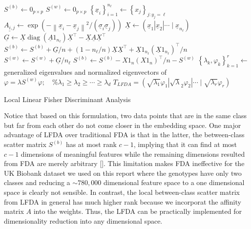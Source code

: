 \documentclass[a4paper,12pt]{article}
\begin{document}
\begin{algorithm}[H]
\SetAlgoLined
 ${S}^{(b)} \longleftarrow 0_{p \times p}$ 
 ${S}^{(w)} \longleftarrow 0_{p \times p}$ \; 
  {
 $\left\{\underline{x}_{i}\right\}_{i=1}^{n_{\ell}} \longleftarrow\left\{x_{j}\right\}_{j: y_{j}=\ell}$ \;
  {
 $\underline{A_{i, j}} \longleftarrow \exp \left(-\left\|\underline{x}_{i}-\underline{x}_{j}\right\|^{2} /\left(\underline{\sigma}_{i} \underline{\sigma}_{j}\right)\right)$}
 $\underline{X} \longleftarrow\left(\underline{x}_{1}\left|\underline{x}_{2}\right| \cdots \mid \underline{x}_{n_{\ell}}\right)$ \;
 $\underline{G} \longleftarrow \underline{X} \operatorname{diag}\left(\underline{A}{1}_{n_{\ell}}\right) \underline{X}^{\top}-\underline{X} \underline{A} \underline{X}^{\top}$ \;
 $S^{(b)} \longleftarrow {S}^{(b)}+\underline{G} / n+\left(1-n_{\ell} / n\right) \underline{X} \underline{X}^{\top}+\underline{X} 1_{n_{\ell}}\left(\underline{X} 1_{n_{\ell}}\right)^{\top} / n$ \;
 $S^{(w)} \longleftarrow {S}^{(w)}+\underline{G} / n_{\ell}$}
 $S^{(b)} \longleftarrow S^{(b)}-X 1_{n}\left(X 1_{n}\right)^{\top} / n- S^{(w)}$ \;
 $\left\{\lambda_{k}, \varphi_{k}\right\}_{k=1}^{r} \longleftarrow$ generalized eigenvalues and normalized eigenvectors of $\varphi=\lambda S^{(w)} \varphi ; \quad \% \lambda_{1} \geq \lambda_{2} \geq \cdots \geq \lambda_{d}$ \;
$T_{L F D A}=\left(\sqrt{\lambda_{1}} {\varphi}_{1}\left|\sqrt{{\lambda}}_{2}{\varphi}_{2}\right| \cdots \mid \sqrt{{\lambda}_{r}} {\varphi}_{r}\right)$
\caption{Local Linear Fisher Discriminant Analysis}
\end{algorithm}

Notice that based on this formulation, two data points that are in the same class but far from each other do not come closer in the embedding space. One major advantage of LFDA over traditional FDA is that in the latter, the between-class scatter matrix $S^{(b)}$ has at most rank $c-1$, implying that it can find at most $c-1$ dimensions of meaningful features while the remaining dimensions resulted from FDA are merely arbitrary [\cite{fukunaga2013introduction}]. This limitation makes FDA ineffective for the UK Biobank dataset we used on this report where the genotypes have only two classes and reducing a $\sim780,000$ dimensional feature space to a one dimensional space is clearly not sensible. In contrast, the local between-class scatter matrix from LFDA in general has much higher rank because we incorporat the affinity matrix $A$ into the weights. Thus, the LFDA can be practically implemented for dimensionality reduction into any dimensional space.
\end{document}
